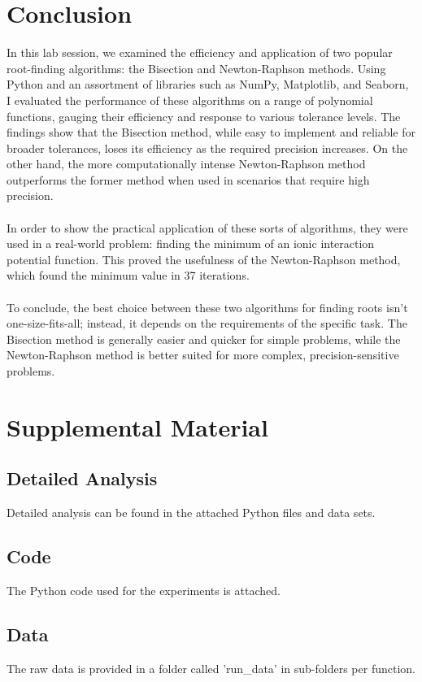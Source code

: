 \documentclass{llncs}
\numberwithin{figure}{section}
\begin{document}
\newpage
\section{Conclusion}
In this lab session, we examined the efficiency and application of two popular root-finding algorithms: the Bisection and Newton-Raphson methods. Using Python and an assortment of libraries such as NumPy, Matplotlib, and Seaborn, I evaluated the performance of these algorithms on a range of polynomial functions, gauging their efficiency and response to various tolerance levels. The findings show that the Bisection method, while easy to implement and reliable for broader tolerances, loses its efficiency as the required precision increases. On the other hand, the more computationally intense Newton-Raphson method outperforms the former method when used in scenarios that require high precision.
\\\\
In order to show the practical application of these sorts of algorithms, they were used in a real-world problem: finding the minimum of an ionic interaction potential function. This proved the usefulness of the Newton-Raphson method, which found the minimum value in 37 iterations.
\\\\
To conclude, the best choice between these two algorithms for finding roots isn’t one-size-fits-all; instead, it depends on the requirements of the specific task. The Bisection method is generally easier and quicker for simple problems, while the Newton-Raphson method is better suited for more complex, precision-sensitive problems.
\vspace{2em}
\appendix
\section{Supplemental Material}
\subsection{Detailed Analysis}
Detailed analysis can be found in the attached Python files and data sets.

\subsection{Code}
The Python code used for the experiments is attached.

\subsection{Data}
The raw data is provided in a folder called 'run\_data' in sub-folders per function.
\end{document}
